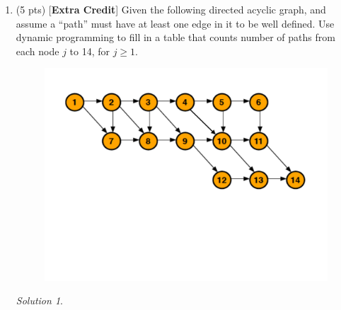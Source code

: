 \documentclass[12pt]{article}
\theoremstyle{remark}
\newtheorem*{solution}{Solution}
\begin{document}
\begin{enumerate}
\begin{enumerate}
\end{enumerate}
\pagebreak
    
        \item (5 pts) [\textbf{Extra Credit}] Given the following directed acyclic graph, and assume a ``path'' must have at least one edge in it to be well defined. Use dynamic programming to fill in a table that counts number of paths from each node $j$ to 14, for $j \geq 1$. 

        \begin{figure}[h!]
        \begin{center}
        \includegraphics[scale=0.45]{dag_ps9.pdf} 
        \end{center}
        \end{figure}
    
        \begin{solution}

        \end{solution}


\end{enumerate}
\end{document}
